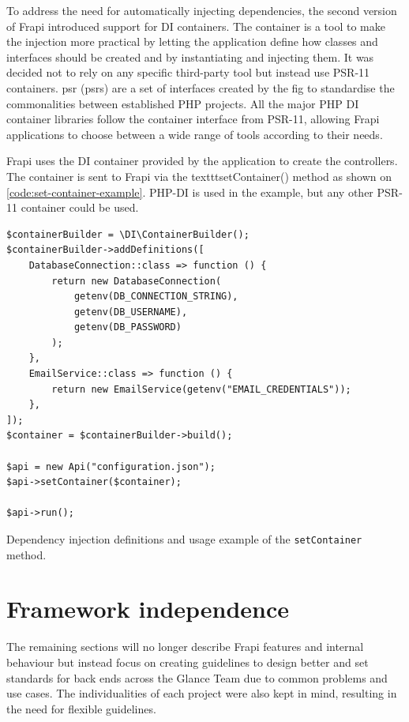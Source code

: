 To address the need for automatically injecting dependencies, the second version of Frapi introduced support for DI containers. The container is a tool to make the injection more practical by letting the application define how classes and interfaces should be created and by instantiating and injecting them. It was decided not to rely on any specific third-party tool but instead use PSR-11 \cite{psr-11} containers. \acrlong{psr} (\acrshort{psr}s) are a set of interfaces created by the \acrfull{fig} \cite{fig-website} to standardise the commonalities between established PHP projects. All the major PHP DI container libraries follow the container interface from PSR-11, allowing Frapi applications to choose between a wide range of tools according to their needs.

Frapi uses the DI container provided by the application to create the controllers. The container is sent to Frapi via the texttt{setContainer()} method as shown on \autoref{code:set-container-example}. PHP-DI \cite{php-di} is used in the example, but any other PSR-11 container could be used.

\begin{listing}[htbp]
\begin{verbatim}
$containerBuilder = \DI\ContainerBuilder();
$containerBuilder->addDefinitions([
	DatabaseConnection::class => function () {
		return new DatabaseConnection(
			getenv(DB_CONNECTION_STRING),
			getenv(DB_USERNAME),
			getenv(DB_PASSWORD)
		);
	},
	EmailService::class => function () {
		return new EmailService(getenv("EMAIL_CREDENTIALS"));
	},
]);
$container = $containerBuilder->build();

$api = new Api("configuration.json");
$api->setContainer($container);

$api->run();
\end{verbatim}
\caption{Dependency injection definitions and usage example of the \texttt{setContainer} method.}
\label{code:set-container-example}
\end{listing}

\section{Framework independence}

The remaining sections will no longer describe Frapi features and internal behaviour but instead focus on creating guidelines to design better and set standards for back ends across the Glance Team due to common problems and use cases. The individualities of each project were also kept in mind, resulting in the need for flexible guidelines.

